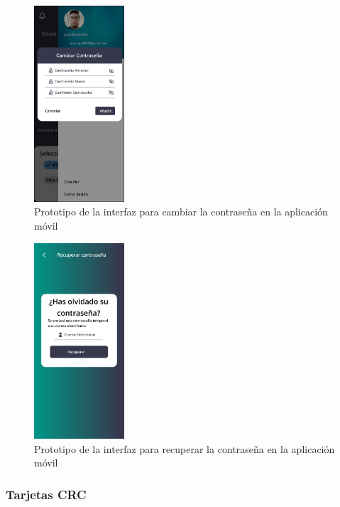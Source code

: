 \begin{figure}[H]
      \centering
      \includegraphics[width=0.3\textwidth]{chapters/III-resultados-y-discusion/resources/images/prototipo-cambiar-contrasena-mobile.png}
      \caption{Prototipo de la interfaz para cambiar la contraseña en la aplicación móvil}
      \label{fig:prototipo-cambiar-contrasena-mobile}
\end{figure}

\begin{figure}[H]
      \centering
      \includegraphics[width=0.3\textwidth]{chapters/III-resultados-y-discusion/resources/images/prototipo-recuperar-contrasena-mobile.png}
      \caption{Prototipo de la interfaz para recuperar la contraseña en la aplicación móvil}
      \label{fig:prototipo-recuperar-contrasena-mobile}
\end{figure}

\subsubsection{Tarjetas CRC}

